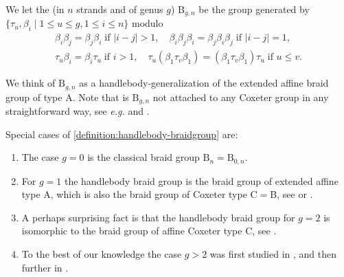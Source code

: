 \documentclass[a4paper,11pt]{amsart}
\let\emph\relax
\newcommand{\eg}{\textsl{e.g.}}
\newcommand{\setstuff}[1]{\mathrm{#1}}
\numberwithin{equation}{section}
\let\fullref\autoref
\begin{document}
\begin{definition}\label{definition:handlebody-braidgroup}
We let the \emph{handlebody braid group} (in $n$ strands and of genus $g$)
$\setstuff{B}_{g,n}$ be the group generated by 
$\{\tau_{u},\beta_{i}\mid 1\leq u\leq g,1\leq i\leq n\}$ modulo
\begin{gather}
\label{eq:handlebody-summary1}
\beta_{i}\beta_{j}=\beta_{j}\beta_{i}\;\text{if }|i-j|>1,\quad
\beta_{i}\beta_{j}\beta_{i}=\beta_{j}\beta_{i}\beta_{j}\;\text{if }|i-j|=1,
\\ 
\label{eq:handlebody-summary2}
\tau_{u}\beta_{i}
=\beta_{i}\tau_{u}\;\text{if }i>1,
\quad
\tau_{u}(\beta_{1}\tau_{v}\beta_{1})
=(\beta_{1}\tau_{v}\beta_{1})\tau_{u}
\;\text{if }u\leq v.
\end{gather}
\end{definition}

We think of $\setstuff{B}_{g,n}$ as a 
handlebody-generalization of the extended affine braid group of type A.
Note that is $\setstuff{B}_{g,n}$ not attached to any Coxeter group in any 
straightforward way, see {\eg} \cite[Remark 4]{La-handlebodies} 
and \cite[(1-7)]{RoTu-homflypt-typea}. 

\begin{remark}\label{remark:braidcox}
Special cases of \fullref{definition:handlebody-braidgroup} are:	
\begin{enumerate}

\setlength\itemsep{0.15cm}

\item The case $g=0$ is the classical braid group $\setstuff{B}_{n}=\setstuff{B}_{0,n}$.

\item For $g=1$ the handlebody braid group is the 
braid group of extended affine type A, which 
is also the braid group of Coxeter type C$=$B, 
see \cite{Brieskorn} or \cite{allcock}.

\item A perhaps surprising fact is that the handlebody braid group 
for $g=2$ is 
isomorphic to the braid group of affine Coxeter type C, 
see \cite{allcock}.

\item To the best of our knowledge the case $g>2$ was first 
studied in \cite{Ve-handlebodies}, 
and then further in \cite{HaOlLa-handlebodies}.

\end{enumerate}
\end{remark}
\end{document}
